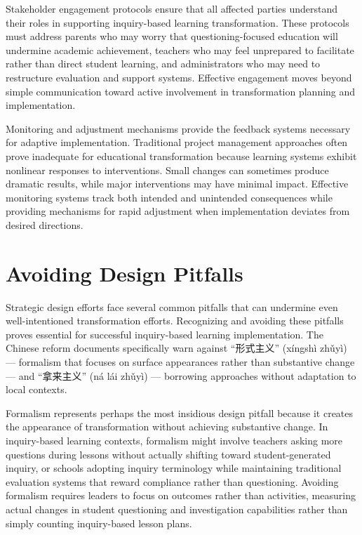 \documentclass[
  Letterpaper,
]{scrbook}
\begin{document}
Stakeholder engagement protocols ensure that all affected parties
understand their roles in supporting inquiry-based learning
transformation. These protocols must address parents who may worry that
questioning-focused education will undermine academic achievement,
teachers who may feel unprepared to facilitate rather than direct
student learning, and administrators who may need to restructure
evaluation and support systems. Effective engagement moves beyond simple
communication toward active involvement in transformation planning and
implementation.

Monitoring and adjustment mechanisms provide the feedback systems
necessary for adaptive implementation. Traditional project management
approaches often prove inadequate for educational transformation because
learning systems exhibit nonlinear responses to interventions. Small
changes can sometimes produce dramatic results, while major
interventions may have minimal impact. Effective monitoring systems
track both intended and unintended consequences while providing
mechanisms for rapid adjustment when implementation deviates from
desired directions.

\section{Avoiding Design Pitfalls}\label{avoiding-design-pitfalls}

Strategic design efforts face several common pitfalls that can undermine
even well-intentioned transformation efforts. Recognizing and avoiding
these pitfalls proves essential for successful inquiry-based learning
implementation. The Chinese reform documents specifically warn against
``形式主义'' (xíngshì zhǔyì) --- formalism that focuses on surface
appearances rather than substantive change --- and ``拿来主义'' (ná lái
zhǔyì) --- borrowing approaches without adaptation to local contexts.

Formalism represents perhaps the most insidious design pitfall because
it creates the appearance of transformation without achieving
substantive change. In inquiry-based learning contexts, formalism might
involve teachers asking more questions during lessons without actually
shifting toward student-generated inquiry, or schools adopting inquiry
terminology while maintaining traditional evaluation systems that reward
compliance rather than questioning. Avoiding formalism requires leaders
to focus on outcomes rather than activities, measuring actual changes in
student questioning and investigation capabilities rather than simply
counting inquiry-based lesson plans.
\end{document}
